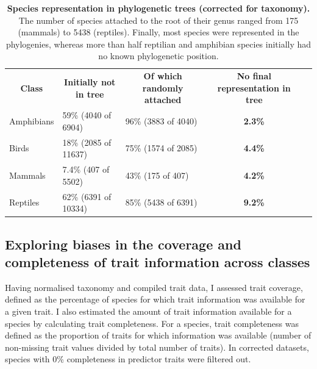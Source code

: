 \begin{table}[h!]
\renewcommand{\baselinestretch}{1}
\renewcommand{\arraystretch}{1.5}
\begin{center}\fontsize{9}{11}\selectfont
\caption[Species representation in phylogenetic trees (corrected taxonomy)]{\textbf{Species representation in phylogenetic trees (corrected for taxonomy).} The number of species attached to the root of their genus ranged from 175 (mammals) to 5438 (reptiles). Finally, most species were represented in the phylogenies, whereas more than half reptilian and amphibian species initially had no known phylogenetic position.} 
\label{random_attachments_phy}
\begin{tabular}{|l|l|l|c|l}
\cline{1-4}
\multicolumn{1}{|c|}{\textbf{Class}} & \multicolumn{1}{c|}{\textbf{Initially not in tree}} & \multicolumn{1}{c|}{\textbf{Of which randomly attached}} & \textbf{No final representation in tree} &  \\ \cline{1-4}
Amphibians                  & 59\% (4040 of 6904)                           & 96\% (3883 of 4040)                     & \textbf{2.3\%}             &  \\ \cline{1-4}
Birds                       & 18\% (2085 of 11637)                          & 75\% (1574 of 2085)                    & \textbf{4.4\%}             &  \\ \cline{1-4}
Mammals                     & 7.4\% (407 of 5502)                           & 43\% (175 of 407)                       & \textbf{4.2\%}            &  \\ \cline{1-4}
Reptiles                    & 62\% (6391 of 10334)                          & 85\% (5438 of 6391)                    & \textbf{9.2\%}             &  \\ \cline{1-4}
\end{tabular}
\end{center}
\end{table}


\subsection{Exploring biases in the coverage and completeness of trait information across classes}
Having normalised taxonomy and compiled trait data, I assessed trait coverage, defined as the percentage of species for which trait information was available for a given trait. I also estimated the amount of trait information available for a species by calculating trait completeness. For a species, trait completeness was defined as the proportion of traits for which information was available (number of non-missing trait values divided by total number of traits). In corrected datasets, species with 0\% completeness in predictor traits were filtered out.

